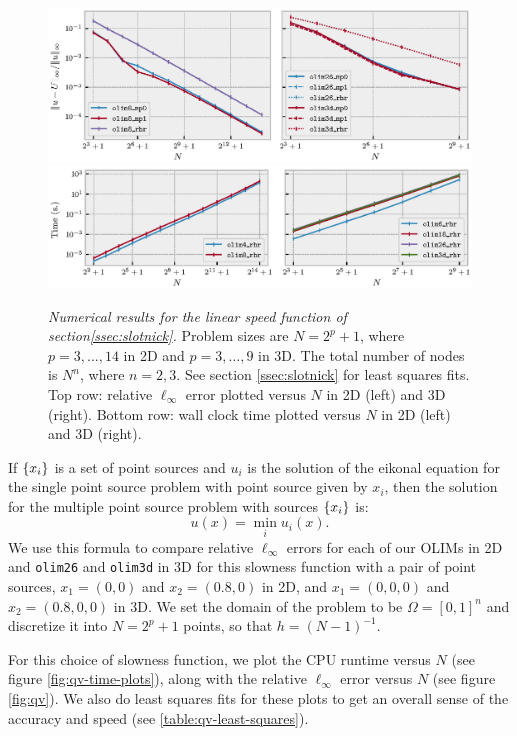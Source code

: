 \documentclass[smallcondensed]{svjour3}
\begin{document}
\begin{figure}
  \centering
  \includegraphics[width=\linewidth]{qv_plots.eps}
  \includegraphics[width=\linewidth]{qv-time-plots.eps}
  \caption{\emph{Numerical results for the linear speed function of
      section\@ \ref{ssec:slotnick}.} Problem sizes are $N = 2^p + 1$,
    where $p = 3, \hdots, 14$ in 2D and $p = 3, \hdots, 9$ in 3D. The
    total number of nodes is $N^n$, where $n = 2, 3$. See section\@
    \ref{ssec:slotnick} for least squares fits. Top row: relative
    $\ell_\infty$ error plotted versus $N$ in 2D (left) and 3D
    (right). Bottom row: wall clock time plotted versus $N$ in 2D
    (left) and 3D (right).}\label{fig:slotnick-plots}
\end{figure}

If $\left\{x_i\right\}$ is a set of point sources and $u_i$ is the solution of
the eikonal equation for the single point source problem with point
source given by $x_i$, then the solution for the multiple point source
problem with sources $\left\{x_i\right\}$ is:
\begin{equation}
  u(x) = \min_i u_i(x).
\end{equation}
We use this formula to compare relative $\ell_\infty$ errors for each
of our OLIMs in 2D and \texttt{olim26} and \texttt{olim3d} in 3D for
this slowness function with a pair of point sources, $x_1 = (0, 0)$
and $x_2 = (0.8, 0)$ in 2D, and $x_1 = (0, 0, 0)$ and
$x_2 = (0.8, 0, 0)$ in 3D. We set the domain of the problem to be
$\Omega = [0, 1]^n$ and discretize it into $N = 2^p + 1$ points, so
that $h = (N-1)^{-1}$.

For this choice of slowness function, we plot the CPU runtime versus
$N$ (see figure \ref{fig:qv-time-plots}), along with the relative
$\ell_\infty$ error versus $N$ (see figure \ref{fig:qv}). We also do
least squares fits for these plots to get an overall sense of the
accuracy and speed (see \ref{table:qv-least-squares}).
\end{document}
